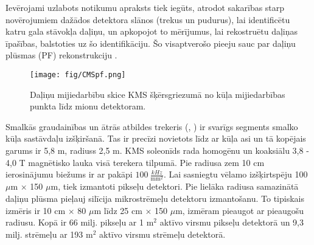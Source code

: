 Ievērojami uzlabots notikumu apraksts tiek iegūts, atrodot sakarības starp novērojumiem dažādos detektora slānos (trekus un pudurus), lai identificētu katru \gls{gala stāvokļa} daļiņu, un apkopojot to mērījumus, lai rekostruētu daļiņas īpašības, balstoties uz šo identifikāciju. Šo visaptverošo pieeju sauc par \gls{daļiņu plūsmas} (PF) rekonstrukciju \cite{Sirunyan:2017ulk}.

\begin{figure}[h]
  \centering
  \texttt{[image: fig/CMSpf.png]}
  \caption{Daļiņu mijiedarbību skice KMS šķērsgriezumā no kūļa mijiedarbības punkta līdz mionu detektoram.}
  \label{fig:CMSpf}
\end{figure}

Smalkās \gls{graudainības} un ātrās atbildes trekeris (\cite{Karimaki:368412}, \cite{tracker_addendum}) ir svarīgs segments smalko kūļa sastāvdaļu izšķiršanā. Tas ir precīzi novietots līdz ar kūļa asi un tā kopējais garums ir 5,8 m, radiuss 2,5 m. KMS soleonīds rada homogēnu un koaksiālu 3,8 - 4,0 T magnētisko lauka visā terekera tilpumā. Pie radiusa zem 10 cm ierosinājumu biežums ir ar pakāpi $100\ \frac{kHz}{\text{mm}^2}$. Lai sasniegtu vēlamo izšķirtspēju 100 $\mu$m $\times$ 150 $\mu$m, tiek izmantoti pikseļu detektori. Pie lielāka radiusa samazinātā daļiņu plūsma pieļauj silīcija mikrostrēmeļu detektoru izmantošanu. To tipiskais izmēris ir 10 cm $\times$ 80 $\mu$m līdz 25 cm $\times$ 150 $\mu$m, izmēram pieaugot ar pieaugošu radiusu. Kopā ir 66 milj. pikseļu ar 1 $\text{m}^2$ aktīvo virsmu pikseļu detektorā un 9,3 milj. strēmeļu ar 193 m${}^2$ aktīvo virsmu strēmeļu detektorā.

